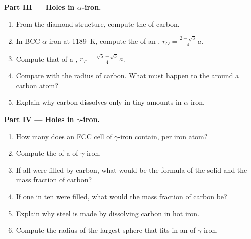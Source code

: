 \begin{problem}
\medskip
\noindent\textbf{Part III --- Holes in $\alpha$-iron.}
\begin{enumerate}[resume]
  \item From the diamond structure, compute the  of carbon.
  \item In BCC $\alpha$-iron at \qty{1189}{K}, compute the 
        of an , $r_O = \frac{2 - \sqrt3}{4}\,a$.
  \item Compute that of a , $r_T = \frac{\sqrt5 -
        \sqrt3}{4}\,a$.
  \item Compare with the radius of carbon. What must happen to the
         around a carbon atom?
  \item Explain why carbon dissolves only in tiny amounts in
        $\alpha$-iron.
\end{enumerate}

\medskip
\noindent\textbf{Part IV --- Holes in $\gamma$-iron.}
\begin{enumerate}[resume]
  \item How many  does an FCC cell of $\gamma$-iron
        contain, per iron atom?
  \item Compute the  of a  of $\gamma$-iron.
  \item If all  were filled by carbon, what would be the
        formula of the solid and the mass fraction of carbon?
  \item If one  in ten were filled, what would the mass
        fraction of carbon be?
  \item Explain why steel is made by dissolving carbon in hot iron.
  \item Compute the radius of the largest sphere that fits in an
         of $\gamma$-iron.
\end{enumerate}
\end{problem}
